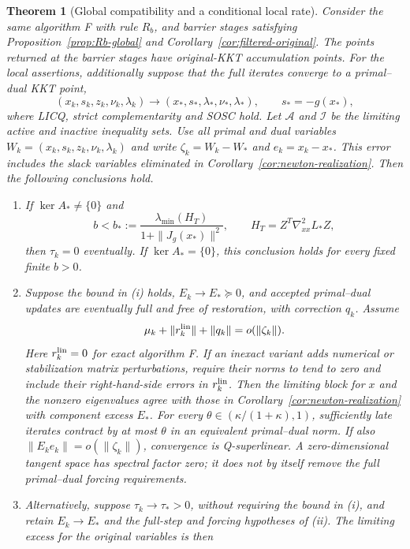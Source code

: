 \documentclass[pdflatex,sn-mathphys-num]{sn-jnl}
\theoremstyle{thmstyleone}
\newtheorem{theorem}{Theorem}[section]
\theoremstyle{thmstylethree}
\newcounter{algorithm}
\begin{document}
\begin{theorem}[Global compatibility and a conditional local rate]
\label{thm:bridge}
Consider the same algorithm F with rule $R_b$, and barrier stages
satisfying Proposition~\ref{prop:Rb-global} and
Corollary~\ref{cor:filtered-original}.
The points returned at the barrier stages have original-KKT accumulation points.
For the local assertions, additionally suppose that the full iterates
converge to a primal--dual KKT point,
\[
 (x_k,s_k,z_k,\nu_k,\lambda_k)
 \longrightarrow(x_*,s_*,\lambda_*,\nu_*,\lambda_*),\qquad
 s_*=-g(x_*),
\]
where LICQ, strict complementarity and SOSC hold. Let $\mathcal A$
and $\mathcal I$ be the limiting active and inactive inequality sets.
Use all primal and dual variables
$W_k=(x_k,s_k,z_k,\nu_k,\lambda_k)$ and write
$\zeta_k=W_k-W_*$ and $e_k=x_k-x_*$. This error includes the slack
variables eliminated in Corollary~\ref{cor:newton-realization}.
Then the following conclusions hold.
\begin{enumerate}[label=(\roman*),leftmargin=2.6em]
\item If $\ker A_*\ne\{0\}$ and
\[
 b<b_*:=\frac{\lambda_{\min}(H_T)}{1+\|J_g(x_*)\|^2},
 \qquad H_T=Z^T\nabla^2_{xx}L_*Z,
\]
then $\tau_k=0$ eventually. If $\ker A_*=\{0\}$, this conclusion
holds for every fixed finite $b>0$.
\item Suppose the bound in (i) holds,
$E_k\to E_*\succeq0$, and accepted primal--dual updates are
eventually full and free of restoration, with correction $q_k$.
Assume
\begin{equation}\label{eq:bridge-forcing}
 \mu_k+\|r_k^{\rm lin}\|+\|q_k\|
       =o(\|\zeta_k\|).
\end{equation}
Here $r_k^{\rm lin}=0$ for exact algorithm F. If an inexact variant
adds numerical or stabilization matrix perturbations, require their
norms to tend to zero and include their right-hand-side errors in
$r_k^{\rm lin}$.
Then the limiting block for $x$ and the nonzero eigenvalues agree with those in
Corollary~\ref{cor:newton-realization} with component excess $E_*$.
For every $\theta\in(\kappa/(1+\kappa),1)$, sufficiently late iterates
contract by at most $\theta$ in an equivalent primal--dual norm.
If also $\|E_ke_k\|=o(\|\zeta_k\|)$, convergence is Q-superlinear.
A zero-dimensional tangent space has spectral factor zero; it does
not by itself remove the full primal--dual forcing requirements.
\item Alternatively, suppose $\tau_k\to\tau_*>0$, without requiring
the bound in (i), and retain $E_k\to E_*$ and the full-step and
forcing hypotheses of (ii). The limiting excess for the original variables is then

\end{enumerate}
\end{theorem}
\end{document}
